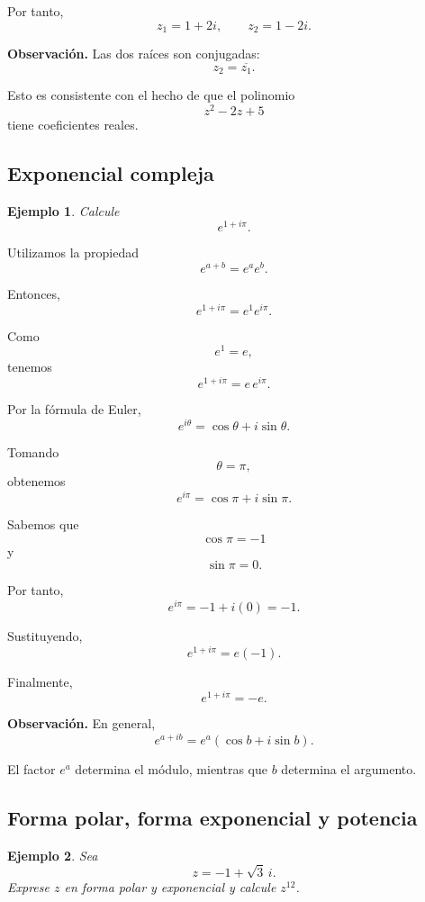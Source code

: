 \documentclass[12pt]{article}
\newtheorem{Ejem}{Ejemplo}
\begin{document}
Por tanto,
\[
\boxed{
z_1=1+2i,
\qquad
z_2=1-2i
}.
\]

\medskip

\noindent
\textbf{Observación.}
Las dos raíces son conjugadas:
\[
z_2=\overline{z_1}.
\]

Esto es consistente con el hecho de que el polinomio
\[
z^2-2z+5
\]
tiene coeficientes reales.

\subsection{Exponencial compleja}

\begin{Ejem}
Calcule
\[
e^{1+i\pi}.
\]
\end{Ejem}

Utilizamos la propiedad
\[
e^{a+b}=e^ae^b.
\]

Entonces,
\[
e^{1+i\pi}
=
e^1e^{i\pi}.
\]

Como
\[
e^1=e,
\]
tenemos
\[
e^{1+i\pi}
=
e\,e^{i\pi}.
\]

Por la fórmula de Euler,
\[
e^{i\theta}
=
\cos\theta+i\sin\theta.
\]

Tomando
\[
\theta=\pi,
\]
obtenemos
\[
e^{i\pi}
=
\cos\pi+i\sin\pi.
\]

Sabemos que
\[
\cos\pi=-1
\]
y
\[
\sin\pi=0.
\]

Por tanto,
\[
e^{i\pi}
=
-1+i(0)
=
-1.
\]

Sustituyendo,
\[
e^{1+i\pi}
=
e(-1).
\]

Finalmente,
\[
\boxed{
e^{1+i\pi}=-e
}.
\]

\medskip

\noindent
\textbf{Observación.}
En general,
\[
\boxed{
e^{a+ib}
=
e^a(\cos b+i\sin b)
}.
\]

El factor $e^a$ determina el módulo, mientras que $b$
determina el argumento.

\subsection{Forma polar, forma exponencial y potencia}

\begin{Ejem}
Sea
\[
z=-1+\sqrt3\,i.
\]
Exprese $z$ en forma polar y exponencial y calcule $z^{12}$.
\end{Ejem}
\end{document}
